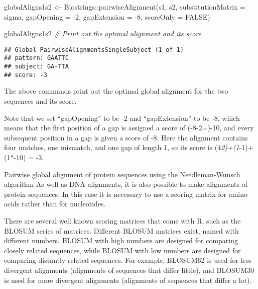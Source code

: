 \documentclass[
]{book}
\newenvironment{Shaded}{\begin{snugshade}}{\end{snugshade}}
\newcommand{\AttributeTok}[1]{\textcolor[rgb]{0.77,0.63,0.00}{#1}}
\newcommand{\CommentTok}[1]{\textcolor[rgb]{0.56,0.35,0.01}{\textit{#1}}}
\newcommand{\ConstantTok}[1]{\textcolor[rgb]{0.00,0.00,0.00}{#1}}
\newcommand{\DecValTok}[1]{\textcolor[rgb]{0.00,0.00,0.81}{#1}}
\newcommand{\FunctionTok}[1]{\textcolor[rgb]{0.00,0.00,0.00}{#1}}
\newcommand{\NormalTok}[1]{#1}
\newcommand{\OtherTok}[1]{\textcolor[rgb]{0.56,0.35,0.01}{#1}}
\newcommand{\SpecialCharTok}[1]{\textcolor[rgb]{0.00,0.00,0.00}{#1}}
\begin{document}
\begin{Shaded}
\begin{Highlighting}[]
\NormalTok{globalAligns1s2 }\OtherTok{\textless{}{-}}\NormalTok{ Biostrings}\SpecialCharTok{::}\FunctionTok{pairwiseAlignment}\NormalTok{(s1, s2, }
                                                 \AttributeTok{substitutionMatrix =}\NormalTok{ sigma, }
                                                 \AttributeTok{gapOpening =} \SpecialCharTok{{-}}\DecValTok{2}\NormalTok{,}
                                                 \AttributeTok{gapExtension =} \SpecialCharTok{{-}}\DecValTok{8}\NormalTok{, }
                                                 \AttributeTok{scoreOnly =} \ConstantTok{FALSE}\NormalTok{)}
\end{Highlighting}
\end{Shaded}

\begin{Shaded}
\begin{Highlighting}[]
\NormalTok{globalAligns1s2 }\CommentTok{\# Print out the optimal alignment and its score}
\end{Highlighting}
\end{Shaded}

\begin{verbatim}
## Global PairwiseAlignmentsSingleSubject (1 of 1)
## pattern: GAATTC
## subject: GA-TTA
## score: -3
\end{verbatim}

The above commands print out the optimal global alignment for the two sequences and its score.

Note that we set ``gapOpening'' to be -2 and ``gapExtension'' to be -8, which means that the first position of a gap is assigned a score of (-8-2=)-10, and every subsequent position in a gap is given a score of -8. Here the alignment contains four matches, one mismatch, and one gap of length 1, so its score is (4\emph{2)+(1}-1)+(1*-10) = -3.

Pairwise global alignment of protein sequences using the Needleman-Wunsch algorithm
As well as DNA alignments, it is also possible to make alignments of protein sequences. In this case it is necessary to use a scoring matrix for amino acids rather than for nucleotides.

There are several well known scoring matrices that come with R, such as the BLOSUM series of matrices. Different BLOSUM matrices exist, named with different numbers. BLOSUM with high numbers are designed for comparing closely related sequences, while BLOSUM with low numbers are designed for comparing distantly related sequences. For example, BLOSUM62 is used for less divergent alignments (alignments of sequences that differ little), and BLOSUM30 is used for more divergent alignments (alignments of sequences that differ a lot).
\end{document}
